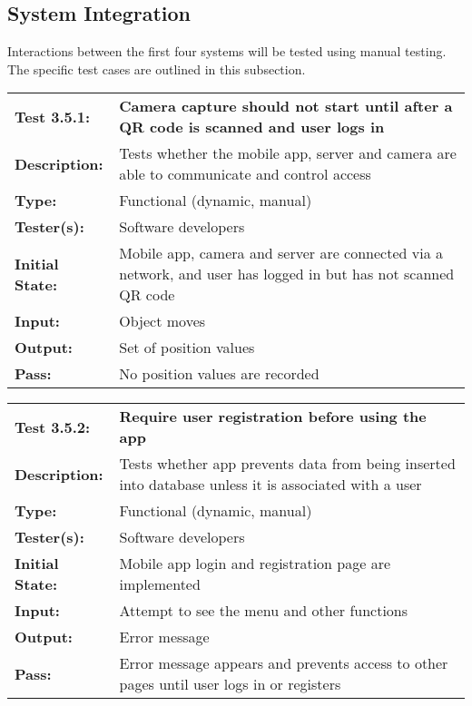 \documentclass{article}
\newenvironment{testcase}
    {
    \begin{center}
    \begin{mdframed}[
        userdefinedwidth=15.5cm,
        leftmargin=1cm,
        rightmargin=1cm
        ]
    \begin{tabular}{p{2.5cm} p{9cm}}
    }
    {
    \end{tabular}
    \end{mdframed}
    \end{center}
    }
\newcommand{\tctit}[2]{\textbf{#1} & \textbf{#2}}
\newcommand{\tcdesc}{\textbf{Description:}}
\newcommand{\tctype}{\textbf{Type:}}
\newcommand{\testers}{\textbf{Tester(s):}}
\newcommand{\tcinit}{\textbf{Initial State:}}
\newcommand{\tcin}{\textbf{Input:}}
\newcommand{\tcout}{\textbf{Output:}}
\newcommand{\tcpass}{\textbf{Pass:}}
\begin{document}
\newpage
\subsection{System Integration}
Interactions between the first four systems will be tested using manual testing. The specific test cases are outlined in this subsection.

\begingroup
\begin{testcase}
\tctit{Test 3.5.1:}{Camera capture should not start until after a QR code is scanned and user logs in} \\
\tcdesc & Tests whether the mobile app, server and camera are able to communicate and control access\\
\tctype & Functional (dynamic, manual) \\
\testers & Software developers \\
\tcinit & Mobile app, camera and server are connected via a network, and user has logged in but has not scanned QR code\\
\tcin & Object moves \\
\tcout & Set of position values\\
\tcpass & No position values are recorded \\
\end{testcase}
\endgroup


\begingroup
\begin{testcase}
\tctit{Test 3.5.2:}{Require user registration before using the app} \\
\tcdesc & Tests whether app prevents data from being inserted into database unless it is associated with a user \\
\tctype & Functional (dynamic, manual) \\
\testers & Software developers \\
\tcinit & Mobile app login and registration page are implemented \\
\tcin & Attempt to see the menu and other functions \\
\tcout & Error message\\
\tcpass & Error message appears and prevents access to other pages until user logs in or registers \\
\end{testcase}
\endgroup
\end{document}
